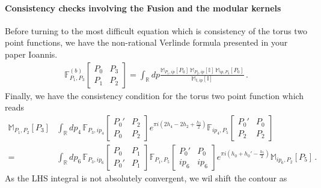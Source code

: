 \documentclass[11pt]{article}
\begin{document}
\paragraph{Consistency checks involving the Fusion and the modular kernels}
Before turning to the most difficult equation which is consistency of the torus two point functions, we have the non-rational Verlinde formula presented in your paper Ioannis.
\begin{equation}
    \begin{aligned}
        \mathbb{F}^{(b)}_{P_1,P_3}\begin{bmatrix}
            P_0 & P_3 \\
            P_1 & P_2
        \end{bmatrix}
        = \int_{\mathbb{R}} dp \frac{\mathbb{M}_{P_1,ip}[P_0]\,\mathbb{M}_{P_2,ip}[\mathbb{I}]\,\mathbb{M}_{ip, P_3}[P_0]}{\mathbb{M}_{\mathbb{I},ip}[\mathbb{I}]}\,.
    \end{aligned}
\end{equation}
Finally, we have the consistency condition for the torus two point function which reads
\begin{equation}
    \begin{aligned}
        \mathbb{M}_{P_1,P_2}[P_3]&\int_{\mathbb{R}} dp_4 \, \mathbb{F}_{P_3, ip_4}\begin{bmatrix}
            P_0' & P_2 \\
            P_0 & P_2
        \end{bmatrix}
        e^{\pi i (2h_4-2h_2+\frac{h_3}{2})}\mathbb{F}_{ip_4, P_5} \begin{bmatrix}
            P_0' & P_0 \\
            P_2 & P_2
        \end{bmatrix}\\
        =& \int_{\mathbb{R}} dp_6 \, \mathbb{F}_{P_3, ip_6}\begin{bmatrix}
            P_0 & P_1 \\
            P_0' & P_1
        \end{bmatrix}
        \mathbb{F}_{P_1,P_5}\begin{bmatrix}
            P_0' & P_0 \\
            ip_6 & ip_6
        \end{bmatrix}
        e^{\pi i (h_0+h_0'-\frac{h_5}{2})}\mathbb{M}_{ip_6,P_2}[P_5]\,.
    \end{aligned}
\end{equation}
As the LHS integral is not absolutely convergent, we wil shift the contour as
\end{document}

